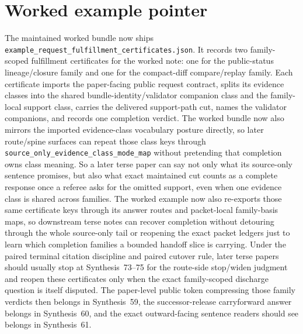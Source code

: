 \documentclass[11pt]{article}
\begin{document}
\section{Worked example pointer}
The maintained worked bundle now ships \nolinkurl{example_request_fulfillment_certificates.json}.\cite{series:workedexample}
It records two family-scoped fulfillment certificates for the worked note: one for the public-status lineage/closure family and one for the compact-diff compare/replay family.
Each certificate imports the paper-facing public request contract, splits its evidence classes into the shared bundle-identity/validator companion class and the family-local support class, carries the delivered support-path cut, names the validator companions, and records one completion verdict. The worked bundle now also mirrors the imported evidence-class vocabulary posture directly, so later route/spine surfaces can repeat those class keys through \nolinkurl{source_only_evidence_class_mode_map} without pretending that completion owns class meaning.
So a later terse paper can say not only what its source-only sentence promises, but also what exact maintained cut counts as a complete response once a referee asks for the omitted support, even when one evidence class is shared across families. The worked example now also re-exports those same certificate keys through its answer routes and packet-local family-basis maps, so downstream terse notes can recover completion without detouring through the whole source-only tail or reopening the exact packet ledgers just to learn which completion families a bounded handoff slice is carrying. Under the paired terminal citation discipline and paired cutover rule, later terse papers should usually stop at Synthesis~73--75 for the route-side stop/widen judgment and reopen these certificates only when the exact family-scoped discharge question is itself disputed. The paper-level public token compressing those family verdicts then belongs in Synthesis~59, the successor-release carryforward answer belongs in Synthesis~60, and the exact outward-facing sentence readers should see belongs in Synthesis~61.\cite{series:requestsideterminalcitationnormalform,series:pairedterminalcitationdiscipline,series:pairedterminalcutoverrules}
\end{document}

